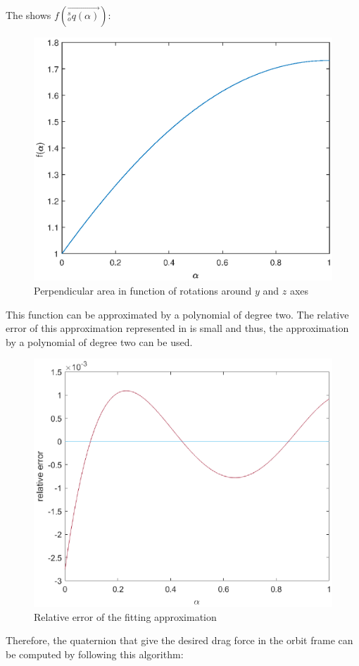 The  shows $f(\vec{ ^s_o q(\alpha)})$:
\begin{figure}[H]
	\centering
	\includegraphics[width=0.8\linewidth]{figures/path_f.eps}
	\caption{Perpendicular area in function of rotations around $y$ and $z$ axes}
	\label{fig:path_alpha}
\end{figure} 
This function can be approximated by a polynomial of degree two. The relative error of this approximation represented in  is small and thus, the approximation by a polynomial of degree two can be used. 
\begin{figure}[H]
	\centering
	\includegraphics[width=0.8\linewidth]{figures/rel_err.eps}
	\caption{Relative error of the fitting approximation }
	\label{fig:rel_err}
\end{figure}
Therefore, the quaternion that give the desired drag force in the orbit frame can be computed by following this algorithm:
